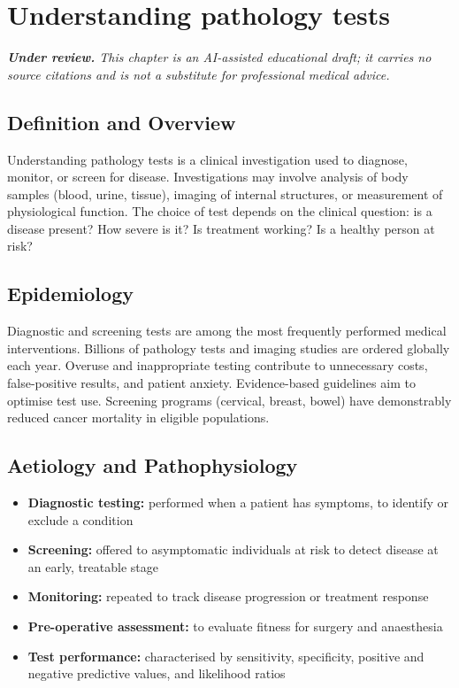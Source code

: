 \chapter{Understanding pathology tests}

\medskip
\noindent\textit{\textbf{Under review.} This chapter is an AI-assisted educational draft; it carries no source citations and is not a substitute for professional medical advice.}

\section*{Definition and Overview}
Understanding pathology tests is a clinical investigation used to diagnose, monitor, or screen for disease. Investigations may involve analysis of body samples (blood, urine, tissue), imaging of internal structures, or measurement of physiological function. The choice of test depends on the clinical question: is a disease present? How severe is it? Is treatment working? Is a healthy person at risk?

\section*{Epidemiology}
Diagnostic and screening tests are among the most frequently performed medical interventions. Billions of pathology tests and imaging studies are ordered globally each year. Overuse and inappropriate testing contribute to unnecessary costs, false-positive results, and patient anxiety. Evidence-based guidelines aim to optimise test use. Screening programs (cervical, breast, bowel) have demonstrably reduced cancer mortality in eligible populations.

\section*{Aetiology and Pathophysiology}
\begin{itemize}
    \item \textbf{Diagnostic testing:} performed when a patient has symptoms, to identify or exclude a condition
    \item \textbf{Screening:} offered to asymptomatic individuals at risk to detect disease at an early, treatable stage
    \item \textbf{Monitoring:} repeated to track disease progression or treatment response
    \item \textbf{Pre-operative assessment:} to evaluate fitness for surgery and anaesthesia
    \item \textbf{Test performance:} characterised by sensitivity, specificity, positive and negative predictive values, and likelihood ratios
\end{itemize}

